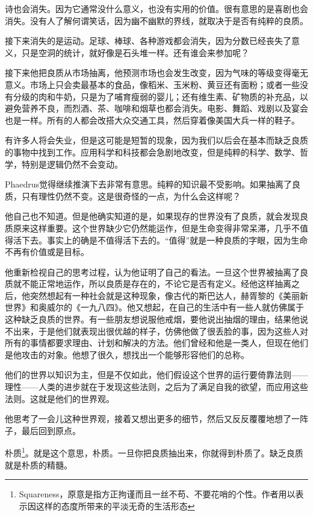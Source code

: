 \documentclass[UTF8]{article}
\begin{document}
\par 诗也会消失。因为它通常没什么意义，也没有实用的价值。很有意思的是喜剧也会消失。没有人了解何谓笑话，因为幽不幽默的界线，就取决于是否有纯粹的良质。
\par 接下来消失的是运动。足球、棒球、各种游戏都会消失，因为分数已经丧失了意义，只是空洞的统计，就好像是石头堆一样。还有谁会来参加呢？
\par 接下来他把良质从市场抽离，他预测市场也会发生改变，因为气味的等级变得毫无意义。市场上只会卖最基本的食品，像稻米、玉米粉、黄豆还有面粉；或者一些没有分级的肉和牛奶，只是为了哺育瘦弱的婴儿；还有维生素、矿物质的补充品，以避免营养不良，而烈酒、茶、咖啡和烟草也都会消失。电影、舞蹈、戏剧以及宴会也是一样。所有的人都会改搭大众交通工具，然后穿着像美国大兵一样的鞋子。
\par 有许多人将会失业，但是这可能是短暂的现象，因为我们以后会在基本而缺乏良质的事物中找到工作。应用科学和科技都会急剧地改变，但是纯粹的科学、数学、哲学，特别是逻辑仍然不会变动。
\par Phaedrus觉得继续推演下去非常有意思。纯粹的知识最不受影响。如果抽离了良质，只有理性仍然不变。这是很奇怪的一点，为什么会这样呢？
\par 他自己也不知道。但是他确实知道的是，如果现存的世界没有了良质，就会发现良质原来这样重要。这个世界缺少它仍然能运作，但是生命变得非常呆滞，几乎不值得活下去。事实上的确是不值得活下去的。“值得”就是一种良质的字眼，因为生命不再有价值或是目标。
\par 他重新检视自己的思考过程，认为他证明了自己的看法。一旦这个世界被抽离了良质就不能正常地运作，所以良质是存在的，不论它是否有定义。经他这样抽离之后，他突然想起有一种社会就是这种现象，像古代的斯巴达人，赫胥黎的《美丽新世界》和奥威尔的《一九八四》。他又想起，在自己的生活中有一些人就仿佛属于这种缺乏良质的世界。有一些朋友想说服他戒烟，要他说出抽烟的理由，结果他说不出来，于是他们就表现出很优越的样子，仿佛他做了很丢脸的事，因为这些人对所有的事情都要求理由、计划和解决的方法。他们曾经和他是一类人，但现在他们是他攻击的对象。他想了很久，想找出一个能够形容他们的总称。
\par 他们的世界以知识为主，但是不仅如此，他们假设这个世界的运行要倚靠法则——理性——人类的进步就在于发现这些法则，之后为了满足自我的欲望，而应用这些法则。这就是他们的世界观。
\par 他思考了一会儿这种世界观，接着又想出更多的细节，然后又反反覆覆地想了一阵子，最后回到原点。
\par 朴质\footnote{Squareness，原意是指方正拘谨而且一丝不苟、不要花哨的个性。作者用以表示因这样的态度所带来的平淡无奇的生活形态}。就是这个意思，朴质。一旦你把良质抽出来，你就得到朴质了。缺乏良质就是朴质的精髓。
\end{document}
